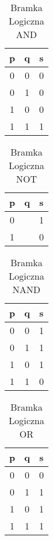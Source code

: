 \documentclass[12pt, letterpaper, titlepage]{article}
\begin{document}
\begin{table}[h]
\centering\caption{Bramka Logiczna AND}
\begin{tabular}{c|c|c}

p & q & s\\
\hline
\hline
0 & 0 & 0\\
\hline
0 & 1 & 0\\
\hline
1 & 0 & 0\\
\hline
1 & 1 & 1\\

\end{tabular}
\end{table}

\begin{table}[h]
\centering\caption{Bramka Logiczna NOT}
\begin{tabular}{c|c|c}

p & q & s\\
\hline
\hline
0 &  & 1\\
\hline
1 &  & 0\\


\end{tabular}
\end{table}

\begin{table}[h]
\centering\caption{Bramka Logiczna NAND}
\begin{tabular}{c|c|c}

p & q & s\\
\hline
\hline
0 & 0 & 1\\
\hline
0 & 1 & 1\\
\hline
1 & 0 & 1\\
\hline
1 & 1 & 0\\

\end{tabular}
\end{table}

\begin{table}[h]
\centering\caption{Bramka Logiczna OR}
\begin{tabular}{c|c|c}

p & q & s\\
\hline
\hline
0 & 0 & 0\\
\hline
0 & 1 & 1\\
\hline
1 & 0 & 1\\
\hline
1 & 1 & 1\\

\end{tabular}
\end{table}
\end{document}

